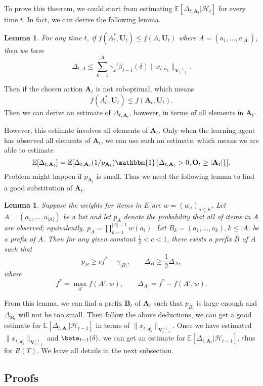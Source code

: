 \documentclass{article}
\newcommand{\EE}{\mathbb{E}}
\newcommand{\bOne}{\mathbbm{1}}
\newcommand{\bA}{\mathbf{A}}
\newcommand{\ba}{\mathbf{a}}
\newcommand{\bB}{\mathbf{B}}
\newcommand{\bO}{\mathbf{O}}
\newcommand{\bU}{\mathbf{U}}
\newcommand{\bV}{\mathbf{V}}
\newcommand{\cH}{\mathcal{H}}
\newcommand{\abs}[1]{\left| #1 \right|}
\newcommand{\norm}[1]{\| #1 \|}
\newtheorem{lemma}[theorem]{Lemma}%
\begin{document}
To prove this theorem, we could start from estimating $\EE[\Delta_{t, \bA_t}|\cH_t]$ for every time $t$. In fact, we can derive the following lemma.
\begin{lemma}
\label{lem:DeltaEstimate}
For any time $t$, if $f(A_t^*, \bU_t) \leq f(A, \bU_t)$ where $A = (a_1, \ldots, a_{\abs{A}})$, then we have
$$
\Delta_{t,A} \leq \sum_{k=1}^{\abs{A}} \gamma_k' \beta_{t-1}(\delta)\norm{x_{t,a_k}}_{\bV_{t-1}^{-1}}.
$$
\end{lemma}

Then if the chosen action $\bA_t$ is not suboptimal, which means
$$
f(A_t^*, \bU_t) \leq f(\bA_t, \bU_t).
$$
Then we can derive an estimate of $\Delta_{t, \bA_t}$, however, in terms of all elements in $\bA_t$. 

However, this estimate involves all elements of $\bA_t$. Only when the learning agent has observed all elements of $\bA_t$, we can use such an estimate, which means we are able to estimate
$$
\EE[\Delta_{t, \bA_t}] = \EE[\Delta_{t, \bA_t}(1/p_{\bA_t}) \bOne\{\Delta_{t, \bA_t} > 0, \bO_t \geq \abs{\bA_t}\}].
$$
Problem might happen if $p_{\bA_t}$ is small. Thus we need the following lemma to find a good substitution of $\bA_t$.

\begin{lemma}
\label{lem:prefixExist}
Suppose the weights for items in $E$ are $w = (w_a)_{a \in E}$. Let $A = (a_1, ..., a_{\abs{A}})$ be a list and let $p_A$ denote the probability that all of items in $A$ are observed; equivalently, $p_A = \prod_{k=1}^{\abs{A}-1}w(a_i)$. Let $B_k = (a_1, ..., a_k), k \leq \abs{A}$ be a prefix of $A$. Then for any given constant $\frac{1}{2} < c < 1$, there exists a prefix $B$ of $A$ such that
$$
p_B \geq c f^* - \gamma_{\abs{B}}, \qquad \Delta_B \geq \frac{1}{2} \Delta_A,
$$
where
$$
f^* = \max_{A'} f(A', w), \qquad \Delta_{A'} = f^* - f(A', w).
$$
\end{lemma}

From this lemma, we can find a prefix $\bB_t$ of $\bA_t$ such that $p_{B_t}$ is large enough and $\Delta_{\bB_t}$ will not be too small. Then follow the above deductions, we can get a good estimate for $\EE[\Delta_{t, \bA_t}|\cH_{t-1}]$ in terms of $\norm{x_{t,\ba_k^t}}_{\bV_{t-1}^{-1}}$. Once we have estimated $\norm{x_{t,\ba_k^t}}_{\bV_{t-1}^{-1}}$ and $\bete_{t-1}(\delta)$, we can get an estimate for $\EE[\Delta_{t, \bA_t}|\cH_{t-1}]$, thus for $R(T)$. We leave all details in the next subsection.


\subsection{Proofs}
\end{document}
